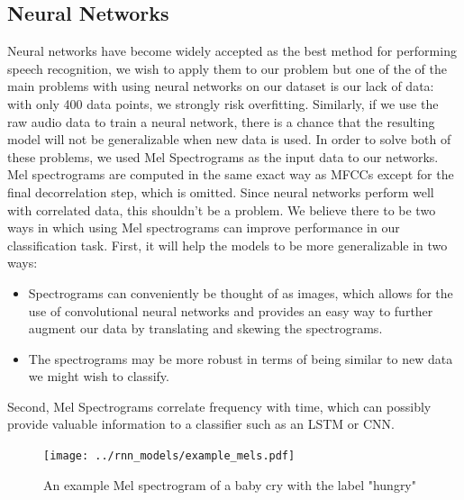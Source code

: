 \documentclass[11pt]{article}
\begin{document}
\subsection{Neural Networks}
Neural networks have become widely accepted as the best method for performing speech recognition, we wish to apply them to our problem but one of the of the main problems with using neural networks on our dataset is our lack of data:
with only 400 data points, we strongly risk overfitting.
Similarly, if we use the raw audio data to train a neural network, there is a chance that the resulting model will not be generalizable when new data is used.
In order to solve both of these problems, we used Mel Spectrograms as the input data to our networks.
Mel spectrograms are computed in the same exact way as MFCCs except for the final decorrelation step, which is omitted. 
Since neural networks perform well with correlated data, this shouldn't be a problem.
We believe there to be two ways in which using Mel spectrograms can improve performance in our classification task. First, it  will help the models to be more generalizable in two ways:
\begin{itemize}
   \item Spectrograms can conveniently be thought of as images, which allows for the use of convolutional neural networks and provides an easy way to further augment our data by translating and skewing the spectrograms.
   \item The spectrograms may be more robust in terms of being similar to new data we might wish to classify.
\end{itemize}
Second, Mel Spectrograms correlate frequency with time, which can possibly provide valuable information to a classifier such as an LSTM or CNN.
\begin{figure}[!htb]
\begin{center}
   \texttt{[image: ../rnn\_models/example\_mels.pdf]}
   \caption{An example Mel spectrogram of a baby cry with the label "hungry"}
\end{center}
\end{figure}
\end{document}

